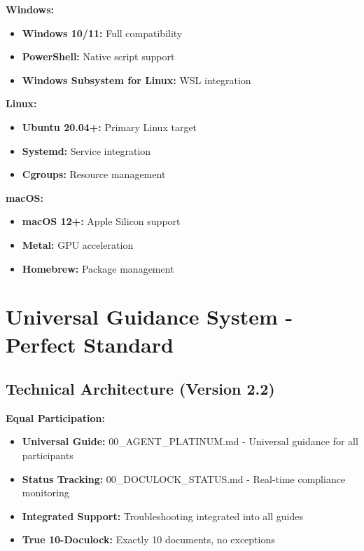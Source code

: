 \documentclass[12pt,a4paper]{article}
\begin{document}
\textbf{Windows:}
\begin{itemize}
    \item \textbf{Windows 10/11:} Full compatibility
    \item \textbf{PowerShell:} Native script support
    \item \textbf{Windows Subsystem for Linux:} WSL integration
\end{itemize}

\textbf{Linux:}
\begin{itemize}
    \item \textbf{Ubuntu 20.04+:} Primary Linux target
    \item \textbf{Systemd:} Service integration
    \item \textbf{Cgroups:} Resource management
\end{itemize}

\textbf{macOS:}
\begin{itemize}
    \item \textbf{macOS 12+:} Apple Silicon support
    \item \textbf{Metal:} GPU acceleration
    \item \textbf{Homebrew:} Package management
\end{itemize}

\section{Universal Guidance System - Perfect Standard}

\subsection{Technical Architecture (Version 2.2)}

\textbf{Equal Participation:}
\begin{itemize}
    \item \textbf{Universal Guide:} 00\_AGENT\_PLATINUM.md - Universal guidance for all participants
    \item \textbf{Status Tracking:} 00\_DOCULOCK\_STATUS.md - Real-time compliance monitoring
    \item \textbf{Integrated Support:} Troubleshooting integrated into all guides
    \item \textbf{True 10-Doculock:} Exactly 10 documents, no exceptions
\end{itemize}
\end{document}
